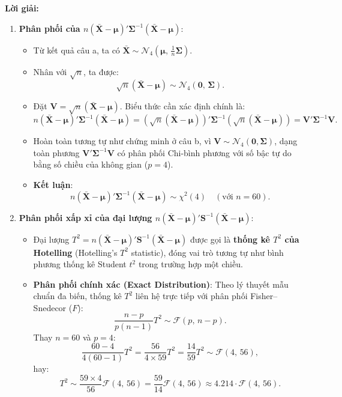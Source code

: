 \documentclass[11pt,a4paper]{article}
\newenvironment{solution}{%
  \par\noindent\textbf{Lời giải:}\ \ignorespaces
}{\par}
\theoremstyle{definition}
\newcommand{\answer}[1]{\boxed{#1}}
\begin{document}
\begin{solution}
\begin{enumerate}[label=\textbf{\alph*)}]
  \item \textbf{Phân phối của $n(\bar{\mathbf{X}} - \boldsymbol{\mu})' \boldsymbol{\Sigma}^{-1} (\bar{\mathbf{X}} - \boldsymbol{\mu})$}:
  \begin{itemize}
    \item Từ kết quả câu a, ta có $\bar{\mathbf{X}} \sim \mathcal{N}_4\left(\boldsymbol{\mu}, \, \frac{1}{n}\boldsymbol{\Sigma}\right)$.
    \item Nhân với $\sqrt{n}$, ta được:
    \[
    \sqrt{n}(\bar{\mathbf{X}} - \boldsymbol{\mu}) \sim \mathcal{N}_4(\mathbf{0}, \, \boldsymbol{\Sigma}).
    \]
    \item Đặt $\mathbf{V} = \sqrt{n}(\bar{\mathbf{X}} - \boldsymbol{\mu})$. Biểu thức cần xác định chính là:
    \[
    n(\bar{\mathbf{X}} - \boldsymbol{\mu})' \boldsymbol{\Sigma}^{-1} (\bar{\mathbf{X}} - \boldsymbol{\mu}) = \left(\sqrt{n}(\bar{\mathbf{X}} - \boldsymbol{\mu})\right)' \boldsymbol{\Sigma}^{-1} \left(\sqrt{n}(\bar{\mathbf{X}} - \boldsymbol{\mu})\right) = \mathbf{V}'\boldsymbol{\Sigma}^{-1}\mathbf{V}.
    \]
    \item Hoàn toàn tương tự như chứng minh ở câu b, vì $\mathbf{V} \sim \mathcal{N}_4(\mathbf{0}, \boldsymbol{\Sigma})$, dạng toàn phương $\mathbf{V}'\boldsymbol{\Sigma}^{-1}\mathbf{V}$ có phân phối Chi-bình phương với số bậc tự do bằng số chiều của không gian ($p = 4$).
    \item \textbf{Kết luận}:
    \[
    n(\bar{\mathbf{X}} - \boldsymbol{\mu})' \boldsymbol{\Sigma}^{-1} (\bar{\mathbf{X}} - \boldsymbol{\mu}) \sim \answer{\chi^2(4)} \quad (\text{với } n = 60).
    \]
  \end{itemize}

  \item \textbf{Phân phối xấp xỉ của đại lượng $n(\bar{\mathbf{X}} - \boldsymbol{\mu})' \mathbf{S}^{-1} (\bar{\mathbf{X}} - \boldsymbol{\mu})$}:
  \begin{itemize}
    \item Đại lượng $T^2 = n(\bar{\mathbf{X}} - \boldsymbol{\mu})' \mathbf{S}^{-1} (\bar{\mathbf{X}} - \boldsymbol{\mu})$ được gọi là \textbf{thống kê $T^2$ của Hotelling} (Hotelling's $T^2$ statistic), đóng vai trò tương tự như bình phương thống kê Student $t^2$ trong trường hợp một chiều.
    \item \textbf{Phân phối chính xác (Exact Distribution)}:
    Theo lý thuyết mẫu chuẩn đa biến, thống kê $T^2$ liên hệ trực tiếp với phân phối Fisher--Snedecor ($F$):
    \[
    \frac{n - p}{p(n - 1)} T^2 \sim \mathcal{F}(p, \, n - p).
    \]
    Thay $n = 60$ và $p = 4$:
    \[
    \frac{60 - 4}{4(60 - 1)} T^2 = \frac{56}{4 \times 59} T^2 = \frac{14}{59} T^2 \sim \mathcal{F}(4, \, 56),
    \]
    hay:
    \[
    T^2 \sim \frac{59 \times 4}{56} \mathcal{F}(4, \, 56) = \frac{59}{14} \mathcal{F}(4, \, 56) \approx 4.214 \cdot \mathcal{F}(4, \, 56).
    \]


\end{itemize}
\end{enumerate}
\end{solution}
\end{document}
